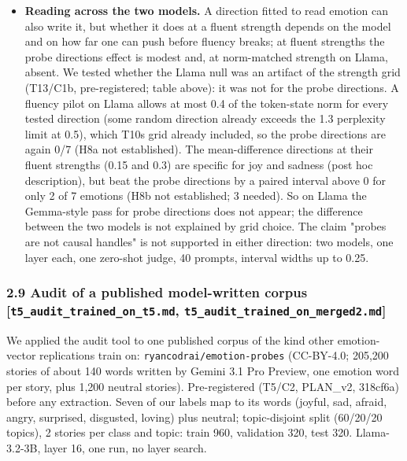 \documentclass[
  10pt,
]{article}
\begin{document}
\begin{itemize}
\item
  \textbf{Reading across the two models.} A direction fitted to read
  emotion can also write it, but whether it does at a fluent strength
  depends on the model and on how far one can push before fluency
  breaks; at fluent strengths the probe directions\textquotesingle{}
  effect is modest and, at norm-matched strength on Llama, absent. We
  tested whether the Llama null was an artifact of the strength grid
  (T13/C1b, pre-registered; table above): it was not for the probe
  directions. A fluency pilot on Llama allows at most 0.4 of the
  token-state norm for every tested direction (some random direction
  already exceeds the 1.3 perplexity limit at 0.5), which
  T10\textquotesingle s grid already included, so the probe directions
  are again 0/7 (H8a not established). The mean-difference directions at
  their fluent strengths (0.15 and 0.3) are specific for joy and sadness
  (post hoc description), but beat the probe directions by a paired
  interval above 0 for only 2 of 7 emotions (H8b not established; 3
  needed). So on Llama the Gemma-style pass for probe directions does
  not appear; the difference between the two models is not explained by
  grid choice. The claim "probes are not causal handles" is not
  supported in either direction: two models, one layer each, one
  zero-shot judge, 40 prompts, interval widths up to 0.25.
\end{itemize}

\subsubsection{\texorpdfstring{2.9 Audit of a published model-written
corpus {[}\texttt{t5\_audit\_trained\_on\_t5.md},
\texttt{t5\_audit\_trained\_on\_merged2.md}{]}}{2.9 Audit of a published model-written corpus {[}t5\_audit\_trained\_on\_t5.md, t5\_audit\_trained\_on\_merged2.md{]}}}\label{29-audit-of-a-published-model-written-corpus-t5_audit_trained_on_t5md-t5_audit_trained_on_merged2md}

We applied the audit tool to one published corpus of the kind other
emotion-vector replications train on: \texttt{ryancodrai/emotion-probes}
(CC-BY-4.0; 205,200 stories of about 140 words written by Gemini 3.1 Pro
Preview, one emotion word per story, plus 1,200 neutral stories).
Pre-registered (T5/C2, PLAN\_v2, 318cf6a) before any extraction. Seven
of our labels map to its words (joyful, sad, afraid, angry, surprised,
disgusted, loving) plus neutral; topic-disjoint split (60/20/20 topics),
2 stories per class and topic: train 960, validation 320, test 320.
Llama-3.2-3B, layer 16, one run, no layer search.
\end{document}
